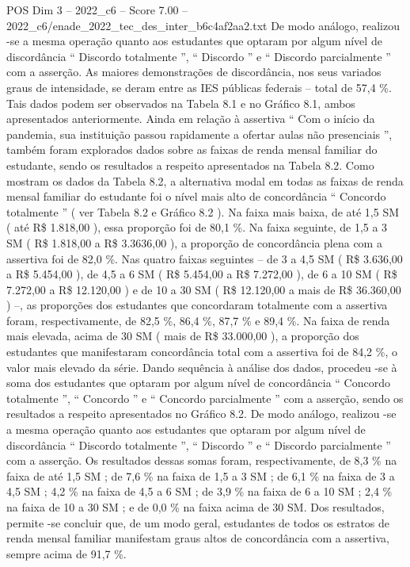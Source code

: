 \begin{textsample}{POS Dim 3 – 2022\_c6 – Score 7.00 – 2022\_c6/enade\_2022\_tec\_des\_inter\_b6c4af2aa2.txt}
De modo análogo, realizou -se a mesma operação quanto aos estudantes que optaram por algum nível de discordância “ Discordo totalmente ”, “ Discordo ” e “ Discordo parcialmente ” com a asserção.
As maiores demonstrações de discordância, nos seus variados graus de intensidade, se deram entre as IES públicas federais – total de 57,4 \%.
Tais dados podem ser observados na Tabela 8.1 e no Gráfico 8.1, ambos apresentados anteriormente.
Ainda em relação à assertiva “ Com o início da pandemia, sua instituição passou rapidamente a ofertar aulas não presenciais ”, também foram explorados dados sobre as faixas de renda mensal familiar do estudante, sendo os resultados a respeito apresentados na Tabela 8.2.
Como mostram os dados da Tabela 8.2, a alternativa modal em todas as faixas de renda mensal familiar do estudante foi o nível mais alto de concordância “ Concordo totalmente ” ( ver Tabela 8.2 e Gráfico 8.2 ).
Na faixa mais baixa, de até 1,5 SM ( até R\$ 1.818,00 ), essa proporção foi de 80,1 \%.
Na faixa seguinte, de 1,5 a 3 SM ( R\$ 1.818,00 a R\$ 3.3636,00 ), a proporção de concordância plena com a assertiva foi de 82,0 \%.
Nas quatro faixas seguintes – de 3 a 4,5 SM ( R\$ 3.636,00 a R\$ 5.454,00 ), de 4,5 a 6 SM ( R\$ 5.454,00 a R\$ 7.272,00 ), de 6 a 10 SM ( R\$ 7.272,00 a R\$ 12.120,00 ) e de 10 a 30 SM ( R\$ 12.120,00 a mais de R\$ 36.360,00 ) –, as proporções dos estudantes que concordaram totalmente com a assertiva foram, respectivamente, de 82,5 \%, 86,4 \%, 87,7 \% e 89,4 \%.
Na faixa de renda mais elevada, acima de 30 SM ( mais de R\$ 33.000,00 ), a proporção dos estudantes que manifestaram concordância total com a assertiva foi de 84,2 \%, o valor mais elevado da série.
Dando sequência à análise dos dados, procedeu -se à soma dos estudantes que optaram por algum nível de concordância “ Concordo totalmente ”, “ Concordo ” e “ Concordo parcialmente ” com a asserção, sendo os resultados a respeito apresentados no Gráfico 8.2.
De modo análogo, realizou -se a mesma operação quanto aos estudantes que optaram por algum nível de discordância “ Discordo totalmente ”, “ Discordo ” e “ Discordo parcialmente ” com a asserção.
Os resultados dessas somas foram, respectivamente, de 8,3 \% na faixa de até 1,5 SM ; de 7,6 \% na faixa de 1,5 a 3 SM ; de 6,1 \% na faixa de 3 a 4,5 SM ; 4,2 \% na faixa de 4,5 a 6 SM ; de 3,9 \% na faixa de 6 a 10 SM ; 2,4 \% na faixa de 10 a 30 SM ; e de 0,0 \% na faixa acima de 30 SM.
Dos resultados, permite -se concluir que, de um modo geral, estudantes de todos os estratos de renda mensal familiar manifestam graus altos de concordância com a assertiva, sempre acima de 91,7 \%.

\end{textsample}
